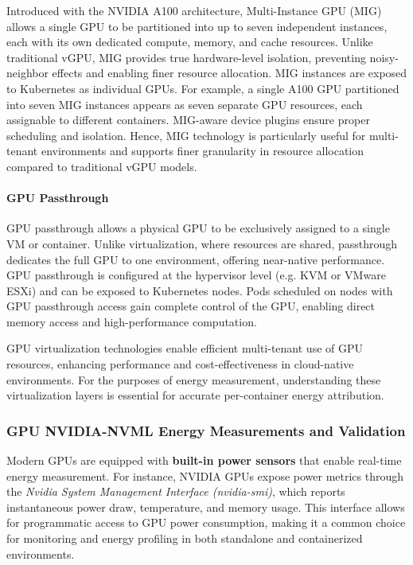 Introduced with the NVIDIA A100 architecture, Multi-Instance GPU (MIG) allows a single GPU to be partitioned into up to seven independent instances, each with its own dedicated compute, memory, and cache resources\cite{nvidia_mig_user_guide}. Unlike traditional vGPU, MIG provides true hardware-level isolation, preventing noisy-neighbor effects and enabling finer resource allocation. MIG instances are exposed to Kubernetes as individual GPUs. For example, a single A100 GPU partitioned into seven MIG instances appears as seven separate GPU resources, each assignable to different containers. MIG-aware device plugins ensure proper scheduling and isolation. Hence, MIG technology is particularly useful for multi-tenant environments and supports finer granularity in resource allocation compared to traditional vGPU models.

\paragraph{GPU Passthrough}

GPU passthrough allows a physical GPU to be exclusively assigned to a single VM or container. Unlike virtualization, where resources are shared, passthrough dedicates the full GPU to one environment, offering near-native performance\cite{nvidia_passthrough}. GPU passthrough is configured at the hypervisor level (e.g. KVM or VMware ESXi) and can be exposed to Kubernetes nodes. Pods scheduled on nodes with GPU passthrough access gain complete control of the GPU, enabling direct memory access and high-performance computation.

GPU virtualization technologies enable efficient multi-tenant use of GPU resources, enhancing performance and cost-effectiveness in cloud-native environments. For the purposes of energy measurement, understanding these virtualization layers is essential for accurate per-container energy attribution.

\subsubsection{GPU NVIDIA-NVML Energy Measurements and Validation}

Modern GPUs are equipped with \textbf{built-in power sensors} that enable real-time energy measurement. For instance, NVIDIA GPUs expose power metrics through the \textit{Nvidia System Management Interface (nvidia-smi)}, which reports instantaneous power draw, temperature, and memory usage\cite{nvidia_smi_docs}. This interface allows for programmatic access to GPU power consumption, making it a common choice for monitoring and energy profiling in both standalone and containerized environments\cite{nvidia_mig_user_guide}.

